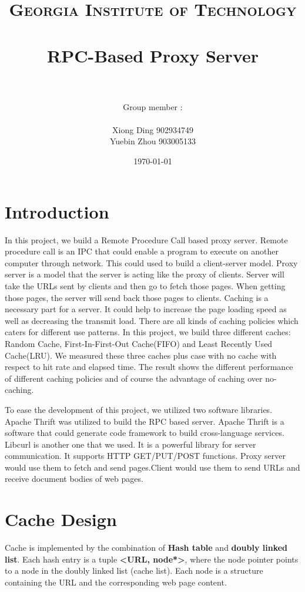 \documentclass[paper=a4, fontsize=11pt]{scrartcl} %
\title{	
\normalfont \normalsize 
\textsc{Georgia Institute of Technology } \\ [25pt] %
\horrule{0.5pt} \\[0.4cm] %
\huge RPC-Based Proxy Server \\ %
\horrule{2pt} \\[0.5cm] %
}
\author{Group member : \\
\\
 Xiong Ding 902934749 \\ 
 Yuebin Zhou 903005133
} %
\date{\normalsize\today} %
\numberwithin{equation}{section} %
\numberwithin{figure}{section} %
\numberwithin{table}{section} %
\begin{document}
\maketitle %


\section{Introduction}

In this project, we build a Remote Procedure Call based proxy server. Remote procedure call is an IPC that could enable a program to execute on another computer through network. This could used to build a client-server model. Proxy server is a model that the server is acting like the proxy of clients. Server will take the URLs sent by clients and then go to fetch those pages. When getting those pages, the server will send back those pages to clients. Caching is a necessary part for a server. It could help to increase the page loading speed as well as decreasing the transmit load. There are all kinds of caching policies which caters for different use patterns. In this project, we build three different caches: Random Cache, First-In-First-Out Cache(FIFO) and Least Recently Used Cache(LRU). We measured these three caches plus case with no cache with respect to hit rate and elapsed time. The result shows the different performance of different caching policies and of course the advantage of caching over no-caching. 


To ease the development of this project, we utilized two software libraries. Apache Thrift was utilized to build the RPC based server. Apache Thrift is a software that could generate code framework to build cross-language services. Libcurl is another one that we used. It is a powerful library for server communication. It supports HTTP GET/PUT/POST functions. Proxy server would use them to fetch and send pages.Client would use them to send URLs and receive document bodies of web pages. 



\section{Cache Design}

Cache is implemented by the combination of \textbf{Hash table} 
and \textbf{doubly linked list}. Each hash entry is 
a tuple \textbf{<URL, node*>}, where the node pointer points to a node
in the doubly linked list (cache list). Each node is a structure
containing the URL and the corresponding web page content.
\end{document}
